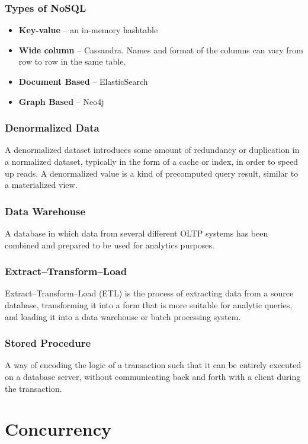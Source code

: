 \documentclass{article}
\begin{document}
    \subsubsection{Types of NoSQL}
    \begin{itemize}
        \item \textbf{Key-value} -- an in-memory hashtable 
        \item \textbf{Wide column} -- Cassandra. Names and format of the columns can vary from row to row in the same table.
        \item \textbf{Document Based} -- ElasticSearch
        \item \textbf{Graph Based} -- Neo4j
    \end{itemize}
    
    \subsubsection{Denormalized Data}
    A denormalized dataset introduces some amount of redundancy or duplication in a normalized dataset, typically in the form of a cache or index, in order to speed up reads. A  denormalized value is a kind of precomputed query result, similar to a materialized view.
    
    \subsubsection{Data Warehouse}
    A database in which data from several different OLTP systems has been combined and prepared to be used for analytics purposes.
    
    \subsubsection{Extract–Transform–Load}
    Extract–Transform–Load (ETL) is the process of extracting data from a source database, transforming it into a form that is more suitable for analytic queries, and loading it into a data warehouse or batch processing system.
    
    \subsubsection{Stored Procedure}
    A way of encoding the logic of a transaction such that it can be entirely executed  on a database server, without communicating back and forth with a client during the transaction.

\newpage
\section{Concurrency}
\end{document}
